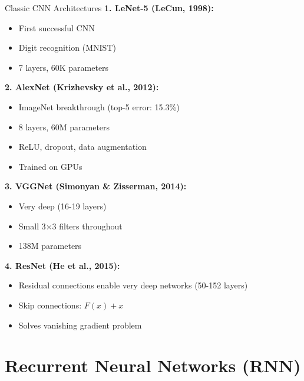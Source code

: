 \documentclass[aspectratio=169]{beamer}
\begin{document}
\begin{frame}{Classic CNN Architectures}
  \textbf{1. LeNet-5 (LeCun, 1998):}
  \begin{itemize}
    \item First successful CNN
    \item Digit recognition (MNIST)
    \item 7 layers, 60K parameters
  \end{itemize}

  \textbf{2. AlexNet (Krizhevsky et al., 2012):}
  \begin{itemize}
    \item ImageNet breakthrough (top-5 error: 15.3\%)
    \item 8 layers, 60M parameters
    \item ReLU, dropout, data augmentation
    \item Trained on GPUs
  \end{itemize}

  \textbf{3. VGGNet (Simonyan \& Zisserman, 2014):}
  \begin{itemize}
    \item Very deep (16-19 layers)
    \item Small 3×3 filters throughout
    \item 138M parameters
  \end{itemize}

  \textbf{4. ResNet (He et al., 2015):}
  \begin{itemize}
    \item Residual connections enable very deep networks (50-152 layers)
    \item Skip connections: $F(x) + x$
    \item Solves vanishing gradient problem
  \end{itemize}
\end{frame}

\section{Recurrent Neural Networks (RNN)}
\end{document}
